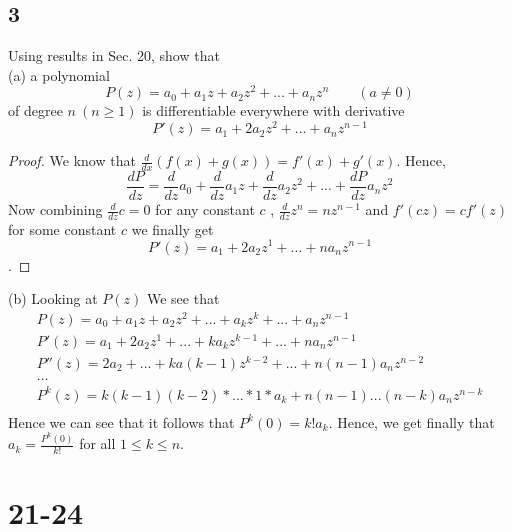 \documentclass{article}
\begin{document}
    \subsection*{3}
    Using results in Sec. 20, show that \\
    (a) a polynomial $$P(z) = a_0 + a_1z + a_2z^2 + ... + a_nz^n \qquad (a \neq 0)$$
    of degree $n \ (n \geq 1)$ is differentiable everywhere with derivative
    $$P'(z) = a_1 + 2a_2z^2 + ... + a_nz^{n-1}$$
    \begin{proof}
        We know that $\frac{d}{dx}(f(x) + g(x)) = f'(x) + g'(x)$. Hence,
        $$\frac{dP}{dz} = \frac{d}{dz}a_0 + \frac{d}{dz}a_1z + \frac{d}{dz}a_2z^2 + ...
        + \frac{dP}{dz}a_nz^2$$ Now combining $\frac{d}{dz}c = 0$ for any constant $c$
        , $\frac{d}{dz} z^n = nz^{n-1}$ and $f'(cz)=cf'(z)$ for some constant $c$ we finally get
        $$P'(z) = a_1 + 2a_2z^1 + ... + na_nz^{n-1}$$.
    \end{proof}
    (b) Looking at $P(z)$ We see that
    \begin{gather*}
        P(z) = a_0 + a_1z + a_2z^2 + ... + a_kz^k + ... + a_nz^{n-1} \\
        P'(z) = a_1 + 2a_2z^1 + ... + ka_kz^{k-1} + ... + na_nz^{n-1} \\
        P''(z) = 2a_2 + ... + ka(k-1)z^{k-2} + ... + n(n-1)a_nz^{n-2} \\
        \dots \\
        P^k(z) = k(k-1)(k-2)*...*1*a_k + n(n-1)...(n-k)a_nz^{n-k} \\ 
    \end{gather*}
    Hence we can see that it follows that $P^k(0) = k!a_k$. Hence, we get finally 
    that $a_k = \frac{P^k(0)}{k!}$ for all $1\leq k \leq n$.
    \section*{21-24}
\end{document}
